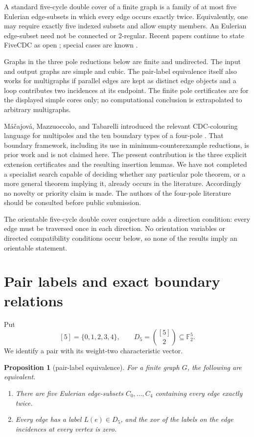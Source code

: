 \documentclass[11pt]{article}
\newtheorem{proposition}[theorem]{Proposition}
\theoremstyle{definition}
\theoremstyle{remark}
\newcommand{\F}{\mathbb F}
\newcommand{\Dfive}{D_5}
\begin{document}
A standard five-cycle double cover of a finite graph is a family of at
most five Eulerian edge-subsets in which every edge occurs exactly twice.
Equivalently, one may require exactly five indexed subsets and allow empty
members.  An Eulerian edge-subset need not be connected or 2-regular.
Recent papers continue to state FiveCDC as open
\cite{Oum2026,HusekSamal2026}; special cases are known
\cite{LiuEtAl2023}.

Graphs in the three pole reductions below are finite and undirected.
The input and output graphs are simple and cubic.  The pair-label
equivalence itself also works for multigraphs if parallel edges are kept
as distinct edge objects and a loop contributes two incidences at its
endpoint.  The finite pole certificates are for the displayed simple
cores only; no computational conclusion is extrapolated to arbitrary
multigraphs.

M\'a\v cajov\'a, Mazzuoccolo, and Tabarelli introduced the relevant
CDC-colouring language for multipoles and the ten boundary types of a
four-pole \cite{MacajovaEtAl2026}.  That boundary framework, including its
use in minimum-counterexample reductions, is prior work and is not claimed
here.  The present contribution is the three explicit extension certificates
and the resulting insertion lemmas.  We have not completed a specialist
search capable of deciding whether any particular pole theorem, or a
more general theorem implying it, already occurs in the literature.
Accordingly no novelty or priority claim is made.  The authors of the
four-pole literature should be consulted before public submission.

The orientable five-cycle double cover conjecture adds a direction
condition: every edge must be traversed once in each direction.  No
orientation variables or directed compatibility conditions occur below,
so none of the results imply an orientable statement.

\section{Pair labels and exact boundary relations}

Put
\[
  [5]=\{0,1,2,3,4\},\qquad
  \Dfive=\binom{[5]}2\subseteq\F_2^5.
\]
We identify a pair with its weight-two characteristic vector.

\begin{proposition}[pair-label equivalence]\label{prop:labels}
For a finite graph \(G\), the following are equivalent.
\begin{enumerate}
\item There are five Eulerian edge-subsets
      \(C_0,\ldots,C_4\) containing every edge exactly twice.
\item Every edge has a label \(L(e)\in\Dfive\), and the xor of the labels
      on the edge incidences at every vertex is zero.
\end{enumerate}
\end{proposition}
\end{document}
